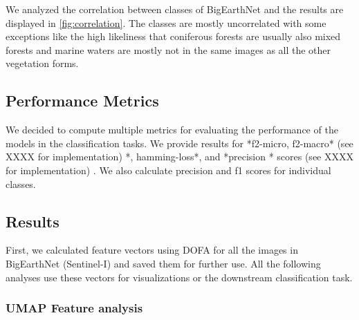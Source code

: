 We analyzed the correlation between classes of BigEarthNet and the results are displayed in \ref{fig:correlation}. The classes are mostly uncorrelated with some exceptions like the high likeliness that coniferous forests are usually also mixed forests and marine waters are mostly not in the same images as all the other vegetation forms.

\subsection{Performance Metrics}

We decided to compute multiple metrics for evaluating the performance of the models in the classification tasks. We provide results for *f2-micro, f2-macro* (see XXXX for implementation) %
*, hamming-loss*, and *precision * scores (see XXXX for implementation) %
. We also calculate precision and f1 scores for individual classes.

\subsection{Results}

First, we calculated feature vectors using DOFA for all the images in BigEarthNet (Sentinel-I) and saved them for further use. All the following analyses use these vectors for visualizations or the downstream classification task.

\subsubsection{UMAP Feature analysis}

